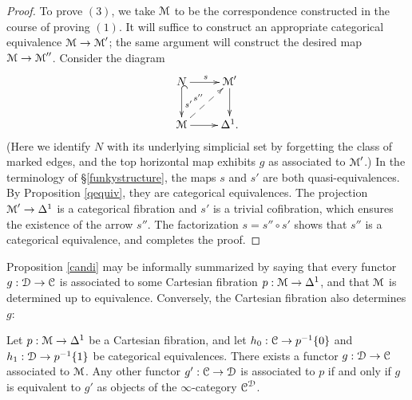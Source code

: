 \begin{proof}
To prove $(3)$, we take $\operatorname{\mathcal{M}}$ to be the correspondence constructed in the course of proving $(1)$. It will suffice to construct an appropriate categorical equivalence $\operatorname{\mathcal{M}} \rightarrow \operatorname{\mathcal{M}}'$; the same argument will construct the desired map $\operatorname{\mathcal{M}} \rightarrow \operatorname{\mathcal{M}}''$. Consider the diagram
$$ \xymatrix{ N \ar@{^{(}->}[d]^{s'} \ar[r]^{s} & \calM' \ar[d] \\
\calM \ar[r] \ar@{-->}[ur]^{s''} & \Delta^1. }$$
(Here we identify $N$ with its underlying simplicial set by forgetting the class of marked edges, and
the top horizontal map exhibits $g$ as associated to $\operatorname{\mathcal{M}}'$.) In the terminology of \S \ref{funkystructure}, the maps $s$ and $s'$ are both quasi-equivalences. By Proposition
\ref{qequiv}, they are categorical equivalences. The projection $\operatorname{\mathcal{M}}' \rightarrow \Delta^1$ is
a categorical fibration and $s'$ is a trivial cofibration, which ensures the existence of the arrow $s''$. 
The factorization $s = s'' \circ s'$ shows that $s''$ is a categorical equivalence, and completes the proof.
\end{proof}

Proposition \ref{candi} may be informally summarized by saying that every functor
$g: \operatorname{\mathcal{D}} \rightarrow \operatorname{\mathcal{C}}$ is associated to some Cartesian fibration $p: \operatorname{\mathcal{M}} \rightarrow \Delta^1$, and that $\operatorname{\mathcal{M}}$ is determined up to equivalence. Conversely, the Cartesian fibration also determines $g$:

\begin{proposition}\label{funcas}
Let $p: \operatorname{\mathcal{M}} \rightarrow \Delta^1$ be a Cartesian fibration, and let
$h_0: \operatorname{\mathcal{C}} \rightarrow p^{-1} \{0\}$ and $h_1: \operatorname{\mathcal{D}} \rightarrow p^{-1} \{1\}$ be
categorical equivalences. There exists a functor $g: \operatorname{\mathcal{D}} \rightarrow \operatorname{\mathcal{C}}$ associated to $\operatorname{\mathcal{M}}$.
Any other functor $g': \operatorname{\mathcal{C}} \rightarrow \operatorname{\mathcal{D}}$ is associated to $p$ if and only if $g$ is equivalent to $g'$ as objects of the $\infty$-category $\operatorname{\mathcal{C}}^{\operatorname{\mathcal{D}}}$.
\end{proposition}

